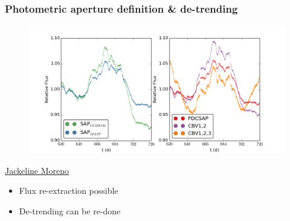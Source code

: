 \documentclass[hyperref={pdfpagelabels=false}]{beamer}
\begin{document}
\begin{frame}
\frametitle{Photometric aperture definition \& de-trending}
  \begin{figure}
    \includegraphics[scale=0.35]{images/kplr006932990-Q7_LCs.jpg}
  \end{figure}
  \begin{center}
    \href{http://www.drexel.edu/physics/contact/graduate/Moreno\ Jackeline/}{{\tiny Jackeline Moreno}}
  \end{center}
  \begin{center}
    \centering
    \begin{itemize}
      \item Flux re-extraction possible
      \item De-trending can be re-done
    \end{itemize}
  \end{center}
\end{frame}
\end{document}
